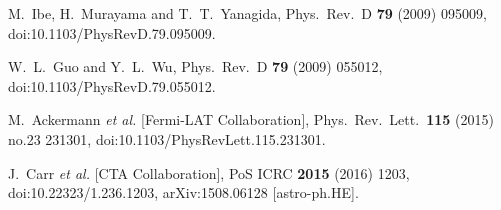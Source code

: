 \documentclass[a4paper,11pt]{article}
\begin{document}
\begin{thebibliography}{99}
  M.~Ibe, H.~Murayama and T.~T.~Yanagida,
  Phys.\ Rev.\ D {\bf 79} (2009) 095009,
  doi:10.1103/PhysRevD.79.095009.

W.~L.~Guo and Y.~L.~Wu,
Phys.\ Rev.\ D {\bf 79} (2009) 055012,
doi:10.1103/PhysRevD.79.055012.

M.~Ackermann {\it et al.} [Fermi-LAT Collaboration],
Phys.\ Rev.\ Lett.\  {\bf 115} (2015) no.23  231301,
doi:10.1103/PhysRevLett.115.231301.

J.~Carr {\it et al.} [CTA Collaboration],
  PoS ICRC {\bf 2015} (2016) 1203,
  doi:10.22323/1.236.1203,   arXiv:1508.06128 [astro-ph.HE].


\end{thebibliography}
\end{document}
